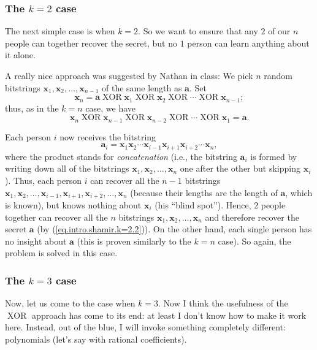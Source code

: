 \documentclass[numbers=enddot,12pt,final,onecolumn,notitlepage]{scrartcl}%
\numberwithin{exer}{subsection}
\theoremstyle{definition}
\begin{document}
\subsubsection{The $k=2$ case}

The next simple case is when $k=2$. So we want to ensure that any $2$ of our
$n$ people can together recover the secret, but no $1$ person can learn
anything about it alone.

A really nice approach was suggested by Nathan in class: We pick $n$ random
bitstrings $\mathbf{x}_{1},\mathbf{x}_{2},\ldots,\mathbf{x}_{n-1}$ of the same
length as $\mathbf{a}$. Set
\[
\mathbf{x}_{n}=\mathbf{a}\operatorname*{XOR}\mathbf{x}_{1}\operatorname*{XOR}%
\mathbf{x}_{2}\operatorname*{XOR}\cdots\operatorname*{XOR}\mathbf{x}_{n-1};
\]
thus, as in the $k=n$ case, we have%
\begin{equation}
\mathbf{x}_{n}\operatorname*{XOR}\mathbf{x}_{n-1}\operatorname*{XOR}%
\mathbf{x}_{n-2}\operatorname*{XOR}\cdots\operatorname*{XOR}\mathbf{x}%
_{1}=\mathbf{a}. \label{eq.intro.shamir.k=2.2}%
\end{equation}


Each person $i$ now receives the bitstring%
\[
\mathbf{a}_{i}=\mathbf{x}_{1}\mathbf{x}_{2}\cdots\mathbf{x}_{i-1}%
\mathbf{x}_{i+1}\mathbf{x}_{i+2}\cdots\mathbf{x}_{n},
\]
where the product stands for \textit{concatenation} (i.e., the bitstring
$\mathbf{a}_{i}$ is formed by writing down all of the bitstrings
$\mathbf{x}_{1},\mathbf{x}_{2},\ldots,\mathbf{x}_{n}$ one after the other but
skipping $\mathbf{x}_{i}$). Thus, each person $i$ can recover all the $n-1$
bitstrings $\mathbf{x}_{1},\mathbf{x}_{2},\ldots,\mathbf{x}_{i-1}%
,\mathbf{x}_{i+1},\mathbf{x}_{i+2},\ldots,\mathbf{x}_{n}$ (because their
lengths are the length of $\mathbf{a}$, which is known), but knows nothing
about $\mathbf{x}_{i}$ (his \textquotedblleft blind spot\textquotedblright).
Hence, $2$ people together can recover all the $n$ bitstrings $\mathbf{x}%
_{1},\mathbf{x}_{2},\ldots,\mathbf{x}_{n}$ and therefore recover the secret
$\mathbf{a}$ (by (\ref{eq.intro.shamir.k=2.2})). On the other hand, each
single person has no insight about $\mathbf{a}$ (this is proven similarly to
the $k=n$ case). So again, the problem is solved in this case.

\subsubsection{The $k=3$ case}

Now, let us come to the case when $k=3$. Now I think the usefulness of the
$\operatorname*{XOR}$ approach has come to its end: at least I don't know how
to make it work here. Instead, out of the blue, I will invoke something
completely different: polynomials (let's say with rational coefficients).
\end{document}
